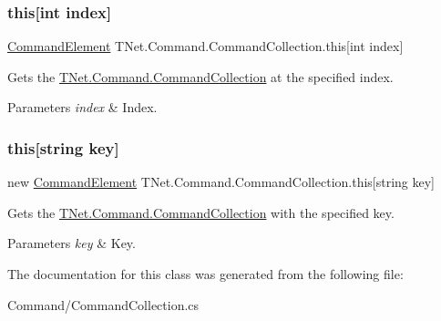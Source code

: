 \subsubsection{\texorpdfstring{this[int index]}{this[int index]}}
{\footnotesize\ttfamily \mbox{\hyperlink{class_t_net_1_1_command_1_1_command_element}{Command\+Element}} T\+Net.\+Command.\+Command\+Collection.\+this\mbox{[}int index\mbox{]}\hspace{0.3cm}{\ttfamily [get]}}



Gets the \mbox{\hyperlink{class_t_net_1_1_command_1_1_command_collection}{T\+Net.\+Command.\+Command\+Collection}} at the specified index. 


\begin{DoxyParams}{Parameters}
{\em index} & Index.\\
\hline
\end{DoxyParams}
\mbox{\label{class_t_net_1_1_command_1_1_command_collection_aa47332d4f0eb06c6f8abce3c18cc0b38}} 
\subsubsection{\texorpdfstring{this[string key]}{this[string key]}}
{\footnotesize\ttfamily new \mbox{\hyperlink{class_t_net_1_1_command_1_1_command_element}{Command\+Element}} T\+Net.\+Command.\+Command\+Collection.\+this\mbox{[}string key\mbox{]}\hspace{0.3cm}{\ttfamily [get]}}



Gets the \mbox{\hyperlink{class_t_net_1_1_command_1_1_command_collection}{T\+Net.\+Command.\+Command\+Collection}} with the specified key. 


\begin{DoxyParams}{Parameters}
{\em key} & Key.\\
\hline
\end{DoxyParams}


The documentation for this class was generated from the following file\+:\begin{DoxyCompactItemize}
\item 
Command/Command\+Collection.\+cs\end{DoxyCompactItemize}
